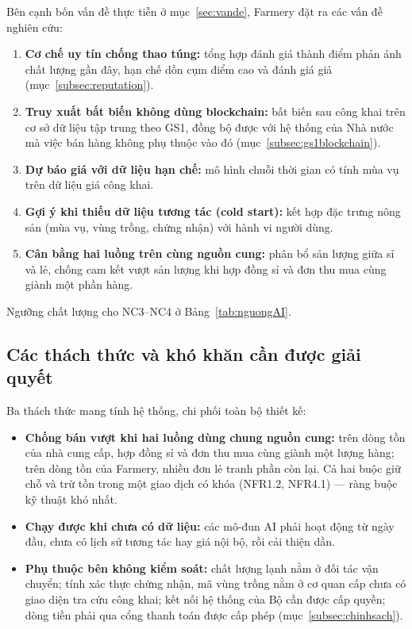 Bên cạnh bốn vấn đề thực tiễn ở mục~\ref{sec:vande}, Farmery đặt ra các vấn đề nghiên cứu:
\begin{enumerate}
    \item[\textbf{NC1.}] \textbf{Cơ chế uy tín chống thao túng:} tổng hợp đánh giá thành điểm phản ánh chất lượng gần đây, hạn chế dồn cụm điểm cao và đánh giá giả (mục~\ref{subsec:reputation}).
    \item[\textbf{NC2.}] \textbf{Truy xuất bất biến không dùng blockchain:} bất biến sau công khai trên cơ sở dữ liệu tập trung theo GS1, đồng bộ được với hệ thống của Nhà nước mà việc bán hàng không phụ thuộc vào đó (mục~\ref{subsec:gs1blockchain}).
    \item[\textbf{NC3.}] \textbf{Dự báo giá với dữ liệu hạn chế:} mô hình chuỗi thời gian có tính mùa vụ trên dữ liệu giá công khai.
    \item[\textbf{NC4.}] \textbf{Gợi ý khi thiếu dữ liệu tương tác (cold start):} kết hợp đặc trưng nông sản (mùa vụ, vùng trồng, chứng nhận) với hành vi người dùng.
    \item[\textbf{NC5.}] \textbf{Cân bằng hai luồng trên cùng nguồn cung:} phân bổ sản lượng giữa sỉ và lẻ, chống cam kết vượt sản lượng khi hợp đồng sỉ và đơn thu mua cùng giành một phần hàng.
\end{enumerate}
Ngưỡng chất lượng cho NC3--NC4 ở Bảng~\ref{tab:nguongAI}.

\subsection{Các thách thức và khó khăn cần được giải quyết}
\label{subsec:thachthuc}

Ba thách thức mang tính hệ thống, chi phối toàn bộ thiết kế:
\begin{itemize}
    \item \textbf{Chống bán vượt khi hai luồng dùng chung nguồn cung:} trên dòng tồn của nhà cung cấp, hợp đồng sỉ và đơn thu mua cùng giành một lượng hàng; trên dòng tồn của Farmery, nhiều đơn lẻ tranh phần còn lại. Cả hai buộc giữ chỗ và trừ tồn trong một giao dịch có khóa (NFR1.2, NFR4.1) --- ràng buộc kỹ thuật khó nhất.
    \item \textbf{Chạy được khi chưa có dữ liệu:} các mô-đun AI phải hoạt động từ ngày đầu, chưa có lịch sử tương tác hay giá nội bộ, rồi cải thiện dần.
    \item \textbf{Phụ thuộc bên không kiểm soát:} chất lượng lạnh nằm ở đối tác vận chuyển; tính xác thực chứng nhận, mã vùng trồng nằm ở cơ quan cấp chưa có giao diện tra cứu công khai; kết nối hệ thống của Bộ cần được cấp quyền; dòng tiền phải qua cổng thanh toán được cấp phép (mục~\ref{subsec:chinhsach}).
\end{itemize}

